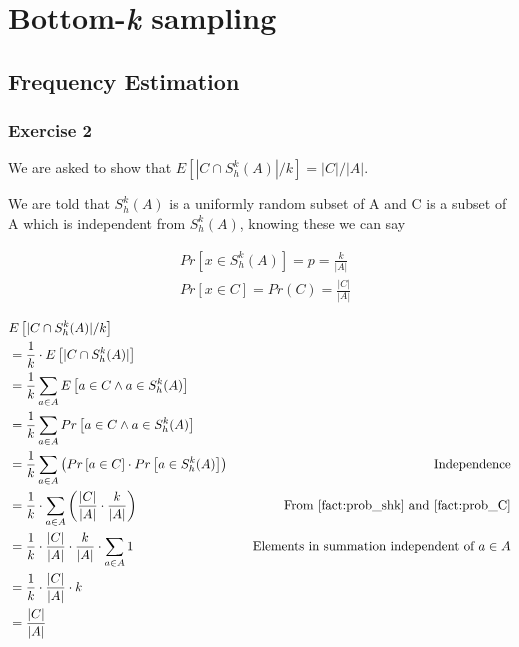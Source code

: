 \section{Bottom-\textit{k} sampling}
\subsection{Frequency Estimation}
\subsubsection{Exercise 2}

We are asked to show that \(E\left[ | C \cap S_h^k(A)| / k\right]  = |C|/|A|\). 

We are told that \(S_h^k(A)\) is a uniformly random subset of A and C is a subset of A which is independent from \(S_h^k(A)\), knowing these we can say 

\begin{align}
&Pr\left[x \in S_h^k(A)\right] = p = \frac{k}{|A|}  \label{fact:prob_shk}\\
&Pr\left[x \in C \right] = Pr(C) = \frac{|C|}{|A|}  \label{fact:prob_C}
\end{align}


\begin{align*}
  & {E}\left[ | C \cap S_h^k(A) | / k \right] & \\
  &= \frac{1}{k} \cdot {E}\left[ | C \cap S_h^k(A) |\right] & \\
  &= \frac{1}{k} \sum_{a\in A} {E}\left[ a \in C \land a \in S_h^k(A) \right] & \\
  &= \frac{1}{k}\sum_{a\in A} Pr\left[ a \in C \land a \in S_h^k(A) \right] & \\
  &= \frac{1}{k}\sum_{a\in A} \left( Pr\left[ a \in C \right] \cdot Pr\left[ a \in S_h^k(A) \right] \right) 
  & \quad \text{Independence} \\
  &= \frac{1}{k} \cdot \sum_{a\in A} \left( \frac{|C|}{|A|} \cdot \frac{k}{|A|} \right) & \quad \text{From \ref{fact:prob_shk} and \ref{fact:prob_C}} \\
  &= \frac{1}{k} \cdot \frac{|C|}{|A|} \cdot \frac{k}{|A|} \cdot \sum_{a\in A} 1 
  & \quad \text{Elements in summation independent of \(a \in A\)} \\
  &= \frac{1}{k} \cdot \frac{|C|}{|A|} \cdot k & \\
  &= \frac{|C|}{|A|} & 
\end{align*}

